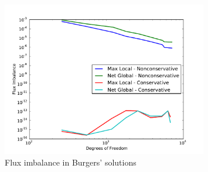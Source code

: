 \documentclass[Proposal.tex]{subfiles}
\begin{document}
\begin{figure}[p]
\centering
\includegraphics[width=0.8\textwidth]{figs/Burgers/graphFlux.pdf}
\caption{Flux imbalance in Burgers' solutions}
\label{fig:burgers_flux}
\end{figure}

%                                                              
%                                                              
%             
\end{document}
